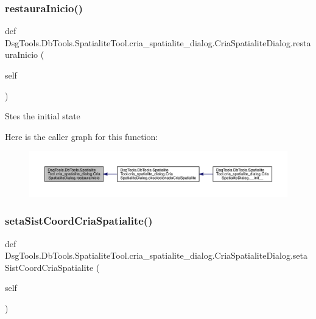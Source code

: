 \subsubsection{\texorpdfstring{restaura\+Inicio()}{restauraInicio()}}
{\footnotesize\ttfamily def Dsg\+Tools.\+Db\+Tools.\+Spatialite\+Tool.\+cria\+\_\+spatialite\+\_\+dialog.\+Cria\+Spatialite\+Dialog.\+restaura\+Inicio (\begin{DoxyParamCaption}\item[{}]{self }\end{DoxyParamCaption})}

\begin{DoxyVerb}Stes the initial state
\end{DoxyVerb}
 Here is the caller graph for this function\+:
\nopagebreak
\begin{figure}[H]
\begin{center}
\leavevmode
\includegraphics[width=350pt]{class_dsg_tools_1_1_db_tools_1_1_spatialite_tool_1_1cria__spatialite__dialog_1_1_cria_spatialite_dialog_a302a63967b368e32910dbfa56f6e583a_icgraph}
\end{center}
\end{figure}
\mbox{\label{class_dsg_tools_1_1_db_tools_1_1_spatialite_tool_1_1cria__spatialite__dialog_1_1_cria_spatialite_dialog_a8d3587ec231d47e613e7187dfa5b4ab6}} 
\subsubsection{\texorpdfstring{seta\+Sist\+Coord\+Cria\+Spatialite()}{setaSistCoordCriaSpatialite()}}
{\footnotesize\ttfamily def Dsg\+Tools.\+Db\+Tools.\+Spatialite\+Tool.\+cria\+\_\+spatialite\+\_\+dialog.\+Cria\+Spatialite\+Dialog.\+seta\+Sist\+Coord\+Cria\+Spatialite (\begin{DoxyParamCaption}\item[{}]{self }\end{DoxyParamCaption})}

